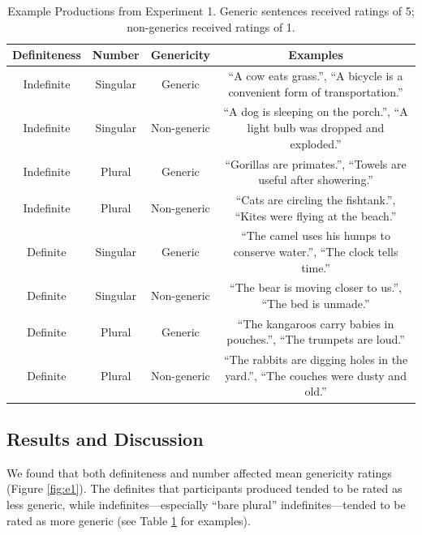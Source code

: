 \documentclass[10pt,letterpaper]{article}
\begin{document}
\begin{table}
\begin{center} 
\caption{Example Productions from Experiment 1. Generic sentences received ratings of 5; non-generics received ratings of 1.} 
\label{tab:ex} 
\vskip 0.12in
\begin{tabular}{cccc} 
\hline
Definiteness    &  Number & Genericity & Examples \\
\hline
Indefinite        &   Singular & Generic & ``A cow eats grass.'', ``A bicycle is a convenient form of transportation.''\\
Indefinite  &   Singular & Non-generic & ``A dog is sleeping on the porch.'', ``A light bulb was dropped and exploded.''\\
Indefinite           &   Plural & Generic & ``Gorillas are primates.'', ``Towels are useful after showering.''\\
Indefinite         &   Plural  & Non-generic & ``Cats are circling the fishtank.'', ``Kites were flying at the beach.''\\
Definite        &   Singular & Generic & ``The camel uses his humps to conserve water.'', ``The clock tells time.''  \\
Definite  &   Singular & Non-generic & ``The bear is moving closer to us.'', ``The bed is unmade.''\\
Definite           &   Plural & Generic & ``The kangaroos carry babies in pouches.'', ``The trumpets are loud.'' \\
Definite         &   Plural & Non-generic & ``The rabbits are digging holes in the yard.'', ``The couches were dusty and old.''\\
\hline
\end{tabular} 
\end{center} 
\end{table}

\subsection{Results and Discussion}

We found that both definiteness and number affected mean genericity ratings (Figure \ref{fig:e1}). The definites that participants produced tended to be rated as less generic, while indefinites---especially ``bare plural'' indefinites---tended to be rated as more generic (see Table \ref{tab:ex} for examples).
\end{document}
